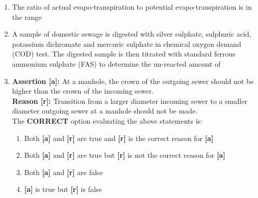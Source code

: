 \documentclass[journal]{IEEEtran}
\numberwithin{equation}{enumi}
\numberwithin{figure}{enumi}
\begin{document}
\begin{enumerate}
\item The ratio of actual evapo-transpiration to potential evapo-transpiration is in the range

\begin{enumerate}
\end{enumerate}

\item A sample of domestic sewage is digested with silver sulphate, sulphuric acid, potassium dichromate and mercuric sulphate in chemical oxygen demand (COD) test. The digested sample is then titrated with standard ferrous ammonium sulphate (FAS) to determine the un-reacted amount of

\begin{enumerate}
\end{enumerate}

\item \textbf{Assertion [a]:} At a manhole, the crown of the outgoing sewer should not be higher than the crown of the incoming sewer. \\
\textbf{Reason [r]:}   Transition from a larger diameter incoming sewer to a smaller diameter outgoing sewer at a manhole should not be made. \\
The \textbf{CORRECT} option evaluating the above statements is:

\begin{enumerate}
    \item Both \textbf{[a]} and \textbf{[r]} are true and \textbf{[r]} is the correct reason for \textbf{[a]}
    \item Both \textbf{[a]} and \textbf{[r]} are true but \textbf{[r]} is not the correct reason for \textbf{[a]}
    \item Both \textbf{[a]} and \textbf{[r]} are false
    \item \textbf{[a]} is true but \textbf{[r]} is false
\end{enumerate}


\end{enumerate}
\end{document}
